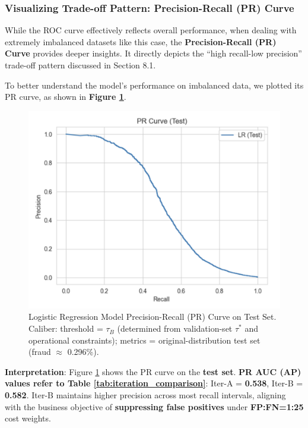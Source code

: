 \documentclass[sigplan,screen]{acmart}
\begin{document}
\subsubsection{Visualizing Trade-off Pattern: Precision-Recall (PR) Curve}

While the ROC curve effectively reflects overall performance, when dealing with extremely imbalanced datasets like this case, the \textbf{Precision-Recall (PR) Curve} provides deeper insights. It directly depicts the ``high recall-low precision'' trade-off pattern discussed in Section 8.1.

To better understand the model's performance on imbalanced data, we plotted its PR curve, as shown in \textbf{Figure \ref{fig:pr_curve}}.

\begin{figure}[h!]
    \centering
    \includegraphics[width=0.9\columnwidth]{8.2.png}
    \caption{Logistic Regression Model Precision-Recall (PR) Curve on Test Set. Caliber: threshold = $\tau_B$ (determined from validation-set $\tau^*$ and operational constraints); metrics = original-distribution test set (fraud $\approx$ 0.296\%).}
    \label{fig:pr_curve}
\end{figure}

\textbf{Interpretation}: Figure \ref{fig:pr_curve} shows the PR curve on the \textbf{test set}. \textbf{PR AUC (AP) values refer to Table \ref{tab:iteration_comparison}}: Iter-A = \textbf{0.538}, Iter-B = \textbf{0.582}. Iter-B maintains higher precision across most recall intervals, aligning with the business objective of \textbf{suppressing false positives} under \textbf{FP:FN=1:25} cost weights.
\end{document}
